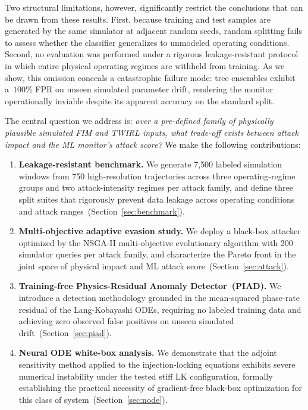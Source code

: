 \documentclass[journal,twocolumn]{IEEEtran}
\begin{document}
Two structural limitations, however, significantly restrict the conclusions that can
be drawn from these results. First, because training and test samples are generated
by the same simulator at adjacent random seeds, random splitting fails to assess
whether the classifier generalizes to unmodeled operating conditions. Second, no
evaluation was performed under a rigorous leakage-resistant protocol in which entire
physical operating regimes are withheld from training. As we show, this omission
conceals a catastrophic failure mode: tree ensembles exhibit a~$100\%$ FPR on
unseen simulated parameter drift, rendering the monitor operationally inviable despite its
apparent accuracy on the standard split.

The central question we address is: \emph{over a pre-defined family of physically
plausible simulated FIM and TWIRL inputs, what trade-off exists between attack impact 
and the ML monitor's attack score?} We make the following contributions:

\begin{enumerate}
  \item \textbf{Leakage-resistant benchmark.} We generate 7{,}500 labeled
    simulation windows from 750 high-resolution trajectories across three operating-regime 
    groups and two attack-intensity regimes per attack family, and define three split suites
    that rigorously prevent data leakage across operating conditions and attack
    ranges~(Section~\ref{sec:benchmark}).

  \item \textbf{Multi-objective adaptive evasion study.} We deploy a black-box
    attacker optimized by the NSGA-II multi-objective evolutionary algorithm
    with 200 simulator queries per attack family, and characterize the Pareto
    front in the joint space of physical impact and ML attack score~(Section~\ref{sec:attack}).

  \item \textbf{Training-free Physics-Residual Anomaly Detector~(PIAD).} We
    introduce a detection methodology grounded in the mean-squared phase-rate 
    residual of the Lang-Kobayashi ODEs, requiring no labeled training data
    and achieving zero observed false positives on unseen simulated drift~(Section~\ref{sec:piad}).

  \item \textbf{Neural ODE white-box analysis.} We demonstrate that the adjoint
    sensitivity method applied to the injection-locking equations exhibits severe
    numerical instability under the tested stiff LK configuration, formally establishing 
    the practical necessity of gradient-free black-box optimization for this class of 
    system~(Section~\ref{sec:node}).
\end{enumerate}
\end{document}
